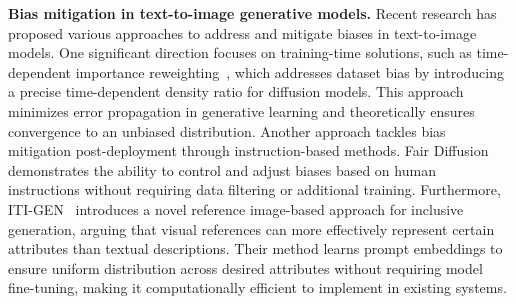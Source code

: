 \noindent \textbf{Bias mitigation in text-to-image generative models.} Recent research has proposed various approaches to address and mitigate biases in text-to-image models. One significant direction focuses on training-time solutions, such as time-dependent importance reweighting~\cite{Kim_2024}, which addresses dataset bias by introducing a precise time-dependent density ratio for diffusion models. This approach minimizes error propagation in generative learning and theoretically ensures convergence to an unbiased distribution. Another approach tackles bias mitigation post-deployment through instruction-based methods. Fair Diffusion~\cite{friedrich2023fair} demonstrates the ability to control and adjust biases based on human instructions without requiring data filtering or additional training. Furthermore, ITI-GEN~\cite{zhang2023iti} introduces a novel reference image-based approach for inclusive generation, arguing that visual references can more effectively represent certain attributes than textual descriptions. Their method learns prompt embeddings to ensure uniform distribution across desired attributes without requiring model fine-tuning, making it computationally efficient to implement in existing systems. 